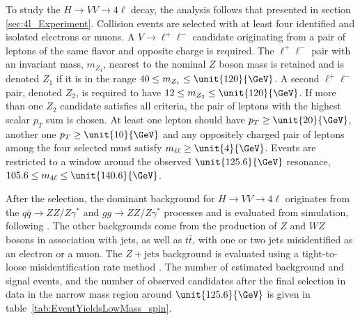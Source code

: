 To study the $H \to VV \to 4\ell$ decay, the analysis follows that presented in section \ref{sec:4l_Experiment}. Collision events are selected with at least four identified and isolated electrons or muons. A $V \to \ell^+\ell^-$ candidate originating from a pair of leptons of the same flavor and opposite charge is required. The $\ell^+\ell^-$ pair with an invariant mass, $m_{Z_1}$, nearest to the nominal $Z$ boson mass is retained
and is denoted $Z_{1}$ if it is in the range $40 \le m_{Z_1} \le \unit{120}{\GeV}$.
A second $\ell^{+}\ell^{-}$ pair, denoted $Z_{2}$, is required to have $12 \le m_{Z_2} \le \unit{120}{\GeV}$.
If more than one $Z_{2}$ candidate satisfies all criteria, the pair of
leptons with the highest scalar $p_{T}$ sum is chosen.
At least one lepton should have $p_{T} \ge \unit{20}{\GeV}$, another one
$p_{T} \ge \unit{10}{\GeV}$ and any oppositely charged pair of leptons among the four selected must satisfy
$m_{\ell\ell} \ge \unit{4}{\GeV}$. Events are restricted to a window around the observed
$\unit{125.6}{\GeV}$ resonance, $105.6 \le m_{4\ell} \le \unit{140.6}{\GeV}$.

After the selection, the dominant background for $H \to VV \to 4\ell$ originates from the
$q\bar{q} \to ZZ/Z\gamma^*$ and $gg \to ZZ/Z\gamma^*$ processes
and is evaluated from simulation, following \cite{Chatrchyan:2013mxa}.
The other backgrounds come from the production of $Z$ and $WZ$ bosons in association with jets,
as well as $t\bar{t}$, with one or two jets misidentified as an electron or a muon.
The $Z + \text{jets}$ background is evaluated using a tight-to-loose misidentification rate method \cite{Chatrchyan:2013mxa}. The number of estimated background and signal events, and the number of
observed candidates after the final selection in data in the
narrow mass region around $\unit{125.6}{\GeV}$  is given in table~\ref{tab:EventYieldsLowMass_spin}.

